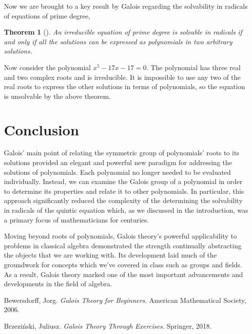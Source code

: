 \documentclass[11pt, a4paper, oneside]{article}
\theoremstyle{plain}
\newtheorem*{thm*}{Theorem}
\theoremstyle{plain}
\theoremstyle{plain}
\theoremstyle{plain}
\theoremstyle{definition}
\theoremstyle{example}
\begin{document}
{\par
Now we are brought to a key result by Galois regarding the solvability in radicals of equations of prime degree,
\begin{thm*}[{\cite[Thm.\ 9.4]{jorg}}] 
An irreducible equation of prime degree is solvable in radicals if and only if all the solutions can be expressed as polynomials in two arbitrary solutions.
\end{thm*}

Now consider the polynomial $x^5 - 17x - 17 = 0$. The polynomial has three real and two complex roots and is irreducible. It is impossible to use any two of the real roots to express the other solutions in terms of polynomials, so the equation is unsolvable by the above theorem.

\newpage
\section{Conclusion}

Galois' main point of relating the symmetric group of polynomials' roots to its solutions provided an elegant and powerful new paradigm for addressing the solutions of polynomials. Each polynomial no longer needed to be evaluated individually. Instead, we can examine the Galois group of a polynomial in order to determine its properties and relate it to other polynomials. In particular, this approach significantly reduced the complexity of the determining the solvability in radicals of the quintic equation which, as we discussed in the introduction, was a primary focus of mathematicians for centuries.

\par
Moving beyond roots of polynomials, Galois theory's powerful applicability to problems in classical algebra demonstrated the strength continually abstracting the objects that we are working with. Its development laid much of the groundwork for concepts which we've covered in class such as groups and fields. As a result, Galois theory marked one of the most important advancements and developments in the field of algebra.

\newpage
\begin{thebibliography}{9}

Bewersdorff, Jorg. \textit{Galois Theory for Beginners}. American Mathematical Society, 2006. 

Brzeziński, Juliusz. \textit{Galois Theory Through Exercises}. Springer, 2018. 


\end{thebibliography}}
\end{document}

